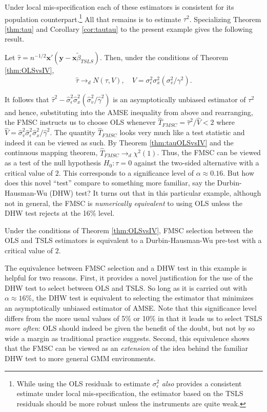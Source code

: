 Under local mis-specification each of these estimators is consistent for its population counterpart.\footnote{While using the OLS residuals to estimate $\sigma_\epsilon^2$ \emph{also} provides a consistent estimate under local mis-specification, the estimator based on the TSLS residuals should be more robust unless the instruments are quite weak.}
All that remains is to estimate $\tau^2$. Specializing Theorem \ref{thm:tau} and Corollary \ref{cor:tautau} to the present example gives the following result.
\begin{thm}
	\label{thm:tauOLSvsIV}
	Let $\widehat{\tau} =  n^{-1/2} \mathbf{x}'(\mathbf{y} - \mathbf{x}\widetilde{\beta}_{TSLS})$. Then, under the conditions of Theorem \ref{thm:OLSvsIV},
	$$\widehat{\tau}\rightarrow_d N(\tau,V), \quad V = \sigma_\epsilon^2 \sigma_x^2(\sigma_v^2/\gamma^2).$$ 
\end{thm}
It follows that $\widehat{\tau}^2 -  \widehat{\sigma}_\epsilon^2\widehat{\sigma}_x^2 \left(\widehat{\sigma}_v^2/\widehat{\gamma}^2\right)$ is an asymptotically unbiased estimator of $\tau^2$ and hence, substituting into the AMSE inequality from above and rearranging, the FMSC instructs us to choose OLS whenever $\widehat{T}_{FMSC} = \widehat{\tau}^2/\widehat{V} < 2$
where $\widehat{V} = \widehat{\sigma}_v^2 \widehat{\sigma}_\epsilon^2 \widehat{\sigma}_x^2/\widehat{\gamma}^2$. 
The quantity $\widehat{T}_{FMSC}$ looks very much like a test statistic and indeed it can be viewed as such. 
By Theorem \ref{thm:tauOLSvsIV} and the continuous mapping theorem, $\widehat{T}_{FMSC} \rightarrow_d \chi^2(1)$. 
Thus, the FMSC can be viewed as a test of the null hypothesis $H_0\colon \tau = 0$ against the two-sided alternative with a critical value of $2$. 
This corresponds to a significance level of $\alpha \approx 0.16$. 
But how does this novel ``test'' compare to something more familiar, say the Durbin-Hausman-Wu (DHW) test? 
It turns out that in this particular example, although not in general, the FMSC is \emph{numerically equivalent} to using OLS unless the DHW test rejects at the 16\% level. 
\begin{thm}
    \label{thm:DHW} Under the conditions of Theorem \ref{thm:OLSvsIV}, FMSC selection between the OLS and TSLS estimators is equivalent to a Durbin-Hausman-Wu pre-test with a critical value of $2$.
\end{thm}
The equivalence between FMSC selection and a DHW test in this example is helpful for two reasons. 
First, it provides a novel justification for the use of the DHW test to select between OLS and TSLS. So long as it is carried out with $\alpha \approx 16\%$, the DHW test is equivalent to selecting the estimator that minimizes an asymptotically unbiased estimator of AMSE. 
Note that this significance level differs from the more usual values of 5\% or 10\% in that it leads us to select TSLS \emph{more often}: OLS should indeed be given the benefit of the doubt, but not by so wide a margin as traditional practice suggests. 
Second, this equivalence shows that the FMSC can be viewed as an \emph{extension} of the idea behind the familiar DHW test to more general GMM environments. 
